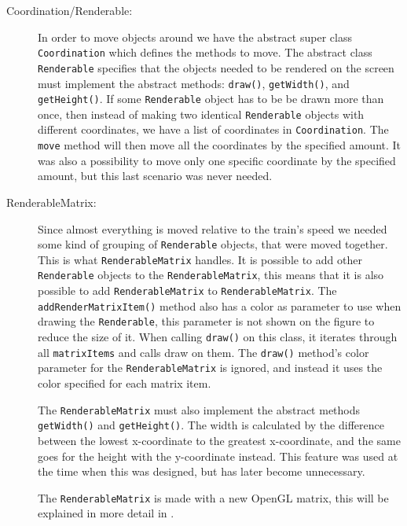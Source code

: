 \begin{description}
\item[Coordination/Renderable:] In order to move objects around we have the abstract super class \lstinline|Coordination| which defines the methods to move. The abstract class \lstinline|Renderable| specifies that the objects needed to be rendered on the screen must implement the abstract methods: \lstinline|draw()|, \lstinline|getWidth()|, and \lstinline|getHeight()|. If some \lstinline|Renderable| object has to be be drawn more than once, then instead of making two identical \lstinline|Renderable| objects with different coordinates, we have a list of coordinates in \lstinline|Coordination|. The \lstinline|move| method will then move all the coordinates by the specified amount. It was also a possibility to move only one specific coordinate by the specified amount, but this last scenario was never needed.

\item[RenderableMatrix:] Since almost everything is moved relative to the train's speed we needed some kind of grouping of \lstinline|Renderable| objects, that were moved together. This is what \lstinline|RenderableMatrix| handles. It is possible to add other \linebreak \lstinline|Renderable| objects to the \lstinline|RenderableMatrix|, this means that it is also possible to add \lstinline|RenderableMatrix| to \lstinline|RenderableMatrix|. The \lstinline|addRenderMatrixItem()| method also has a color as parameter to use when drawing the \lstinline|Renderable|, this parameter is not shown on the figure to reduce the size of it. When calling \lstinline|draw()| on this class, it iterates through all \lstinline|matrixItems| and calls draw on them. The \linebreak \lstinline|draw()| method's color parameter for the \lstinline|RenderableMatrix| is ignored, and instead it uses the color specified for each matrix item.

The \lstinline|RenderableMatrix| must also implement the abstract methods \lstinline|getWidth()| and \lstinline|getHeight()|. The width is calculated by the difference between the lowest x-coordinate to the greatest x-coordinate, and the same goes for the height with the y-coordinate instead. This feature was used at the time when this was designed, but has later become unnecessary.

The \lstinline|RenderableMatrix| is made with a new OpenGL matrix, this will be explained in more detail in .


\end{description}
